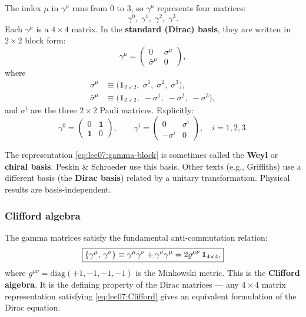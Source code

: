 \documentclass[../main.tex]{subfiles}
\begin{document}
The index $\mu$ in $\gamma^\mu$ runs from $0$ to $3$, so $\gamma^\mu$ represents four matrices:
\[
  \gamma^0,\; \gamma^1,\; \gamma^2,\; \gamma^3.
\]
Each $\gamma^\mu$ is a $4\times4$ matrix.  In the \textbf{standard (Dirac) basis}, they are written in $2\times2$ block form:
\begin{equation}
  \gamma^\mu = \begin{pmatrix}0 & \sigma^\mu \\ \bar\sigma^\mu & 0\end{pmatrix},
  \label{eq:lec07:gamma-block}
\end{equation}
where
\begin{align}
  \sigma^\mu &\equiv \bigl(\mathbf{1}_{2\times2},\;\sigma^1,\;\sigma^2,\;\sigma^3\bigr), \label{eq:lec07:sigma-mu}\\
  \bar\sigma^\mu &\equiv \bigl(\mathbf{1}_{2\times2},\;-\sigma^1,\;-\sigma^2,\;-\sigma^3\bigr), \label{eq:lec07:sigmabar-mu}
\end{align}
and $\sigma^i$ are the three $2\times2$ Pauli matrices.  Explicitly:
\begin{equation}
  \gamma^0 = \begin{pmatrix}0 & \mathbf{1}\\\mathbf{1} & 0\end{pmatrix}, \qquad
  \gamma^i = \begin{pmatrix}0 & \sigma^i\\-\sigma^i & 0\end{pmatrix},\quad i=1,2,3.
  \label{eq:lec07:gamma-explicit}
\end{equation}

\begin{remark}
The representation \eqref{eq:lec07:gamma-block} is sometimes called the \textbf{Weyl} or \textbf{chiral basis}.  Peskin \& Schroeder use this basis.  Other texts (e.g., Griffiths) use a different basis (the \textbf{Dirac basis}) related by a unitary transformation.  Physical results are basis-independent.
\end{remark}

\subsubsection*{Clifford algebra}

The gamma matrices satisfy the fundamental anti-commutation relation:
\begin{equation}
  \boxed{\{\gamma^\mu,\, \gamma^\nu\} \equiv \gamma^\mu\gamma^\nu + \gamma^\nu\gamma^\mu = 2g^{\mu\nu}\,\mathbf{1}_{4\times4},}
  \label{eq:lec07:Clifford}
\end{equation}
where $g^{\mu\nu} = \mathrm{diag}(+1,-1,-1,-1)$ is the Minkowski metric.  This is the \textbf{Clifford algebra}.  It is the defining property of the Dirac matrices — any $4\times4$ matrix representation satisfying \eqref{eq:lec07:Clifford} gives an equivalent formulation of the Dirac equation.
\end{document}
